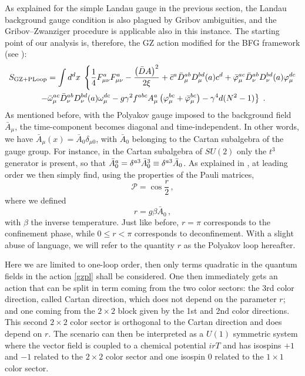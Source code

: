 As explained for the simple Landau gauge in the previous section, the Landau
background gauge condition is also plagued by Gribov ambiguities, and the
Gribov--Zwanziger procedure is applicable also in this instance. The starting
point of our analysis is, therefore, the GZ action modified for the BFG
framework (see \cite{Zwanziger:1982na}):
\begin{multline}
S_\text{GZ+PLoop} = \int d^{d}x\; \left\{ \frac{1}{4}F^{a}_{\mu\nu}F^{a}_{%
\mu\nu} - \frac{\left( \bar{D}A \right)^{2}}{2\xi} + \bar{c}^{a}\bar{D}%
_{\mu}^{ab}D^{bd}_{\mu}(a)c^{d} + \bar{\varphi}_{\mu}^{ac} \bar{D}%
_{\nu}^{ab}D^{bd}_{\nu}(a) \varphi_\mu^{dc} \right. \\
\left. - \bar{\omega}_{\mu}^{ac} \bar{D}_{\nu}^{ab}D^{bd}_{\nu}(a)
\omega_\mu^{dc} - g\gamma ^{2} f^{abc}A_\mu^a \left( \varphi_\mu^{bc} + \bar{%
\varphi}_\mu^{bc} \right) - \gamma^{4}d(N^{2}-1) \right\}\;.  \label{gzpl}
\end{multline}
As mentioned before, with the Polyakov gauge imposed to the background
field $\bar{A}_{\mu}$, the time-component becomes diagonal and
time-independent. In other words, we have $\bar{A}_{\mu}(x) = \bar{A}%
_{0}\delta_{\mu 0}$, with $\bar{A}_{0}$ belonging to the Cartan subalgebra
of the gauge group. For instance, in the Cartan subalgebra of $SU(2)$ only
the $t^{3}$ generator is present, so that $\bar{A}^{a}_{0} = \delta^{a3}\bar{%
A}^{3}_{0}\equiv \delta^{a3}\bar A_0$. As explained in \cite{Reinosa:2014ooa}, at leading order we then simply find, using the properties of the Pauli matrices,
\begin{equation}
\mathcal{P}=\cos\frac{r}{2}\,,
\end{equation}
where we defined
\begin{equation}
  r=g\beta \bar{A}_0\,,
\end{equation}
with $\beta$ the inverse temperature. Just like before, $r=\pi$ corresponds to the confinement phase, while $0\leq r<\pi$ corresponds to deconfinement. With a slight abuse of language, we will refer to the quantity $r$ as the Polyakov loop hereafter.

Here we are limited to one-loop order, then only terms quadratic in the quantum
fields in the action \eqref{gzpl} shall be considered. One then immediately gets an action that
can be split in term coming from the two color sectors: the 3rd color direction, called Cartan
direction, which does not depend on the parameter $r$; and one coming from the $2\times 2$
block given by the 1st and 2nd color directions. This second $2\times2$ color sector is
orthogonal to the Cartan direction and does depend on $r$. The scenario can then be interpreted
as a $U(1)$ symmetric system where the vector field is coupled to a chemical potential $i rT$
and has isospins $+1$ and $-1$ related to the $2\times2$ color sector and one isospin $0$
related to the $1\times1$ color sector.

